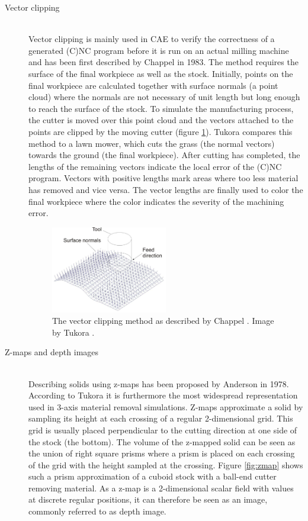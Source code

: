 \begin{description}
	\item[Vector clipping] \hfill \\
	Vector clipping is mainly used in CAE to verify the correctness of a generated (C)NC program before it is run on an actual milling machine and has been first described by Chappel \cite{vector_clipping} in 1983.
	The method requires the surface of the final workpiece as well as the stock.
	Initially, points on the final workpiece are calculated together with surface normals (\ie a point cloud) where the normals are not necessary of unit length but long enough to reach the surface of the stock.
	To simulate the manufacturing process, the cutter is moved over this point cloud and the vectors attached to the points are clipped by the moving cutter (\cf figure \ref{fig:vector_clipping}).
	Tukora compares this method to a lawn mower, which cuts the grass (\ie the normal vectors) towards the ground (\ie the final workpiece).
	After cutting has completed, the lengths of the remaining vectors indicate the local error of the (C)NC program.
	Vectors with positive lengths mark areas where too less material has removed and vice versa.
	The vector lengths are finally used to color the final workpiece where the color indicates the severity of the machining error. 
	
	\begin{figure}[h]
		\centering
		\includegraphics[width=0.5\textwidth]{images/vector_clipping}
		\caption{
			The vector clipping method as described by Chappel \cite{vector_clipping}.
			Image by Tukora \cite{virtual_machining_review}.
		}
		\label{fig:vector_clipping}
	\end{figure}
	 
	 
	\item[Z-maps and depth images] \hfill \\
	Describing solids using z-maps has been proposed by Anderson \cite{zmap} in 1978.
	According to Tukora it is furthermore the most widespread representation used in 3-axis material removal simulations.
	Z-maps approximate a solid by sampling its height at each crossing of a regular 2-dimensional grid.
	This grid is usually placed perpendicular to the cutting direction at one side of the stock (\eg the bottom).
	The volume of the z-mapped solid can be seen as the union of right square prisms where a prism is placed on each crossing of the grid with the height sampled at the crossing.
	Figure \ref{fig:zmap} shows such a prism approximation of a cuboid stock with a ball-end cutter removing material.
	As a z-map is a 2-dimensional scalar field with values at discrete regular positions, it can therefore be seen as an image, commonly referred to as depth image.
	

\end{description}
